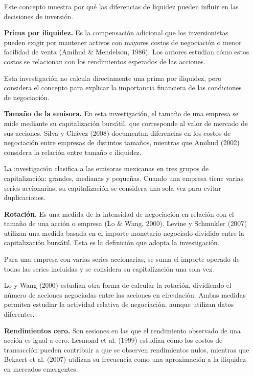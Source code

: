 Este concepto muestra por qué las diferencias de liquidez pueden influir en las decisiones de inversión.

\textbf{Prima por iliquidez.} Es la compensación adicional que los inversionistas pueden exigir por mantener activos con mayores costos de negociación o menor facilidad de venta (Amihud \& Mendelson, 1986). Los autores estudian cómo estos costos se relacionan con los rendimientos esperados de las acciones.

Esta investigación no calcula directamente una prima por iliquidez, pero considera el concepto para explicar la importancia financiera de las condiciones de negociación.

\textbf{Tamaño de la emisora.} En esta investigación, el tamaño de una empresa se mide mediante su capitalización bursátil, que corresponde al valor de mercado de sus acciones. Silva y Chávez (2008) documentan diferencias en los costos de negociación entre empresas de distintos tamaños, mientras que Amihud (2002) considera la relación entre tamaño e iliquidez.

La investigación clasifica a las emisoras mexicanas en tres grupos de capitalización: grandes, medianas y pequeñas. Cuando una empresa tiene varias series accionarias, su capitalización se considera una sola vez para evitar duplicaciones.

\textbf{Rotación.} Es una medida de la intensidad de negociación en relación con el tamaño de una acción o empresa (Lo \& Wang, 2000). Levine y Schmukler (2007) utilizan una medida basada en el importe monetario negociado dividido entre la capitalización bursátil. Esta es la definición que adopta la investigación.

Para una empresa con varias series accionarias, se suma el importe operado de todas las series incluidas y se considera su capitalización una sola vez.

Lo y Wang (2000) estudian otra forma de calcular la rotación, dividiendo el número de acciones negociadas entre las acciones en circulación. Ambas medidas permiten estudiar la actividad relativa de negociación, aunque utilizan datos diferentes.

\textbf{Rendimientos cero.} Son sesiones en las que el rendimiento observado de una acción es igual a cero. Lesmond et al. (1999) estudian cómo los costos de transacción pueden contribuir a que se observen rendimientos nulos, mientras que Bekaert et al. (2007) utilizan su frecuencia como una aproximación a la iliquidez en mercados emergentes.

